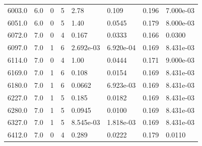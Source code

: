 \documentclass[preview]{standalone}
\begin{document}
{{{{{\begin{tabular}{L{1.2cm}C{1.2cm} C{0.3cm}C{0.5cm} C{1.4cm}C{1.4cm} C{1.4cm}C{1.4cm}}
  6003.0  &   6.0  & 0     &  5 &  2.78  & 0.109  & 0.196 &  7.000e-03   \\ 
  6051.0  &   6.0  & 0     &  5 &  1.40  & 0.0545  & 0.179 &  8.000e-03   \\ 
  6072.0  &   7.0  & 0     &  4 &  0.167  & 0.0333  & 0.166 &  0.0300   \\ 
  6097.0  &   7.0  & 1     &  6 &  2.692e-03  & 6.920e-04  & 0.169 &  8.431e-03   \\ 
  6114.0  &   7.0  & 0     &  4 &  1.00  & 0.0444  & 0.171 &  9.000e-03   \\ 
  6169.0  &   7.0  & 1     &  6 &  0.108  & 0.0154  & 0.169 &  8.431e-03   \\ 
  6180.0  &   7.0  & 1     &  6 &  0.0662  & 6.923e-03  & 0.169 &  8.431e-03   \\ 
  6227.0  &   7.0  & 1     &  5 &  0.185  & 0.0182  & 0.169 &  8.431e-03   \\ 
  6280.0  &   7.0  & 1     &  5 &  0.0945  & 0.0100  & 0.169 &  8.431e-03   \\ 
  6327.0  &   7.0  & 1     &  5 &  8.545e-03  & 1.818e-03  & 0.169 &  8.431e-03   \\ 
  6412.0  &   7.0  & 0     &  4 &  0.289  & 0.0222  & 0.179 &  0.0110   \\ 
\hline 
\end{tabular} 

}}}}}
\end{document}
